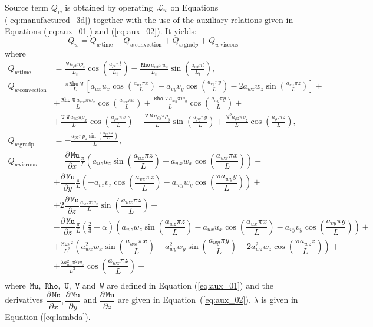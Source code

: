 \documentclass[10pt]{article}
\newcommand{\diff}[2] {\dfrac{\partial #1}{\partial #2}}
\newcommand{\Rho}{\,\mathtt{Rho}}
\newcommand{\U}{\,\mathtt{U}}
\newcommand{\V}{\,\mathtt{V}}
\newcommand{\W}{\,\mathtt{W}}
\newcommand{\Lo}{\,\mathcal{L}}
\newcommand{\Mu}{\,\mathtt{Mu}}
\newcommand{\DMuDx}{\diff{\Mu}{x}}
\newcommand{\DMuDy}{\diff{\Mu}{y}}
\newcommand{\DMuDz}{\diff{\Mu}{z}}
\newcommand{\convection}{\text{convection}}
\newcommand{\gradp}{\text{grad}p}
\newcommand{\viscous}{\text{viscous}}
\begin{document}
Source term $Q_w $ is obtained by operating $\Lo_{w }$ on Equations  (\ref{eq:manufactured_3d}) together with the use of the  auxiliary relations given in Equations (\ref{eq:aux_01}) and (\ref{eq:aux_02}). It yields:
\begin{equation*}
Q_w  = Q_{w  \, \text{time}}+Q_{w  \, \convection}+Q_{w  \, \gradp }+Q_{w  \, \viscous }
\end{equation*}
where
\begin{equation*}
 \begin{split}
 Q_{w \, \text{time}}&= 
\frac{\W \, a_{\rho t} \pi  \rho_{t} }{L_t}\cos\left(\frac{a_{\rho t} \pi t}{L_t}\right) - \frac{\Rho \, a_{wt} \pi w_{t} }{L_t}\sin\left(\frac{a_{wt} \pi t}{L_t}\right),\\
%
 Q_{w \, \text{convection}}&= 
\frac{\pi \Rho \, \W \, }{L}\left[a_{ux} u_{x} \cos\left(\frac{a_{ux} \pi x}{L}\right) + a_{vy} v_{y} \cos\left(\frac{a_{vy} \pi y}{L}\right) - 2 a_{wz} w_{z} \sin\left(\frac{a_{wz} \pi z}{L}\right)\right] + \\ 
&+ \frac{\Rho \, \U \, a_{wx} \pi w_{x} }{L} \cos\left(\frac{a_{wx} \pi x}{L}\right)+ \frac{\Rho \, \V \, a_{wy} \pi w_{y} }{L}\cos\left(\frac{a_{wy} \pi y}{L}\right) + \\ 
&+ \frac{\U \, \W \, a_{\rho x} \pi \rho_{x} }{L}\cos\left(\frac{a_{\rho x} \pi x}{L}\right) - \frac{\V \, \W \, a_{\rho y} \pi \rho_{y} }{L}\sin\left(\frac{a_{\rho y} \pi y}{L}\right)+ \frac{\W^{2} a_{\rho z} \pi \rho_{z} }{L}\cos\left(\frac{a_{\rho z} \pi z}{L}\right) ,\\
%
 Q_{w \, \text{gradp}}&= - \frac{a_{pz} \pi p_{z} \sin\left(\frac{a_{pz} \pi z}{L}\right)}{L},\\
%
 Q_{ w \viscous}&=  
\DMuDx \frac{\pi  }{L}\left(a_{uz} u_{z} \sin\left(\dfrac{a_{uz} \pi z}{L}\right) - a_{wx} w_{x}
\cos\left(\dfrac{a_{wx} \pi x}{L}\right)\right) +\\
%
&+ \DMuDy \frac{\pi  }{L} \left(- a_{vz} v_{z}
\cos\left(\dfrac{a_{vz} \pi z}{L}\right) - a_{wy} w_{y} \cos\left(\dfrac{\pi a_{wy}
y}{L}\right)\right)+\\
%
&+ 2 \DMuDz \frac{ a_{wz} \pi w_{z}}{L}\sin\left(\dfrac{a_{wz} \pi z}{L}\right)+\\
%
&- \DMuDz \frac{\pi }{L} \left(\frac{2}{3} - \alpha\right) \left(a_{wz} w_{z}
\sin\left(\dfrac{a_{wz} \pi z}{L}\right) - a_{ux} u_{x} \cos\left(\dfrac{a_{ux} \pi x}{L}\right) -
a_{vy} v_{y} \cos\left(\dfrac{a_{vy} \pi y}{L}\right)\right) +\\
%
&+ \frac{\Mu \pi^{2} }{L^{2}}\left(a_{wx}^{2} w_{x} \sin\left(\dfrac{a_{wx} \pi x}{L}\right) + 
a_{wy}^{2} w_{y}\sin\left(\dfrac{a_{wy} \pi y}{L}\right) + 2 a_{wz}^{2} w_{z} \cos\left(\dfrac{\pi a_{wz}
z}{L}\right)\right) +\\
%
&+ \frac{\lambda a_{wz}^{2}\pi^{2}  w_{z}  }{L^{2}}\cos\left(\dfrac{a_{wz} \pi z}{L}\right) +\\
%
 \end{split}
\end{equation*}
where $\Mu,\, \Rho,\,\U,\,\V$ and $\W$ are defined in Equation (\ref{eq:aux_01}) and the derivatives $\DMuDx,\DMuDy$ and $\DMuDz$ are given in Equation~(\ref{eq:aux_02}).  $\lambda$ is given in Equation (\ref{eq:lambda}).
\end{document}
